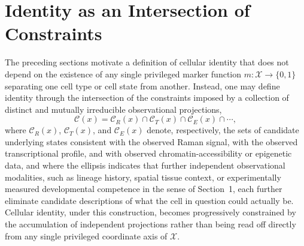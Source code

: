 \documentclass[11pt]{article}
\begin{document}
\section{Identity as an Intersection of Constraints}

The preceding sections motivate a definition of cellular identity that does not depend on the existence of any single privileged marker function $m: \mathcal{X} \to \{0,1\}$ separating one cell type or cell state from another. Instead, one may define identity through the intersection of the constraints imposed by a collection of distinct and mutually irreducible observational projections,
\begin{equation}
\mathcal{C}(x) = \mathcal{C}_R(x) \cap \mathcal{C}_T(x) \cap \mathcal{C}_E(x) \cap \cdots,
\end{equation}
where $\mathcal{C}_R(x)$, $\mathcal{C}_T(x)$, and $\mathcal{C}_E(x)$ denote, respectively, the sets of candidate underlying states consistent with the observed Raman signal, with the observed transcriptional profile, and with observed chromatin-accessibility or epigenetic data, and where the ellipsis indicates that further independent observational modalities, such as lineage history, spatial tissue context, or experimentally measured developmental competence in the sense of Section~1, each further eliminate candidate descriptions of what the cell in question could actually be. Cellular identity, under this construction, becomes progressively constrained by the accumulation of independent projections rather than being read off directly from any single privileged coordinate axis of $\mathcal{X}$.
\end{document}
